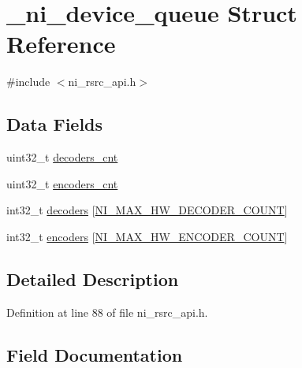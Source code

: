 \hypertarget{struct__ni__device__queue}{}\section{\+\_\+ni\+\_\+device\+\_\+queue Struct Reference}
\label{struct__ni__device__queue}


{\ttfamily \#include $<$ni\+\_\+rsrc\+\_\+api.\+h$>$}

\subsection*{Data Fields}
\begin{DoxyCompactItemize}
\item 
uint32\+\_\+t \mbox{\hyperlink{struct__ni__device__queue_a1f826fcc2c9c459b223b8eef43cbcfd7}{decoders\+\_\+cnt}}
\item 
uint32\+\_\+t \mbox{\hyperlink{struct__ni__device__queue_a12e8c3f68c9f36894d86db79a589b44b}{encoders\+\_\+cnt}}
\item 
int32\+\_\+t \mbox{\hyperlink{struct__ni__device__queue_abdd40a87539b01e9a4ca53d9c50fb374}{decoders}} \mbox{[}\mbox{\hyperlink{ni__rsrc__api_8h_aa1598022fc5ef313306c50f901940946}{N\+I\+\_\+\+M\+A\+X\+\_\+\+H\+W\+\_\+\+D\+E\+C\+O\+D\+E\+R\+\_\+\+C\+O\+U\+NT}}\mbox{]}
\item 
int32\+\_\+t \mbox{\hyperlink{struct__ni__device__queue_a4839ccd6286512d78250a3bad3a60832}{encoders}} \mbox{[}\mbox{\hyperlink{ni__rsrc__api_8h_a41809901a12b4be816387878e15c69f3}{N\+I\+\_\+\+M\+A\+X\+\_\+\+H\+W\+\_\+\+E\+N\+C\+O\+D\+E\+R\+\_\+\+C\+O\+U\+NT}}\mbox{]}
\end{DoxyCompactItemize}


\subsection{Detailed Description}


Definition at line 88 of file ni\+\_\+rsrc\+\_\+api.\+h.



\subsection{Field Documentation}
\mbox{\label{struct__ni__device__queue_abdd40a87539b01e9a4ca53d9c50fb374}} 
